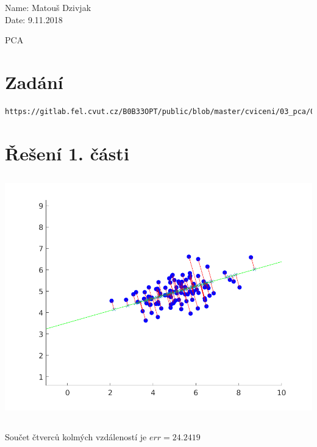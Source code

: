 \documentclass[10pt,a4paper,openright]{article}
\begin{document}
	\begin{flushleft}
		\large Name: Matouš Dzivjak\\
		\large Date: 9.11.2018\\
	\end{flushleft}
\begin{center}
	\huge PCA
\end{center}
\section{Zadání}
\begin{verbatim}
https://gitlab.fel.cvut.cz/B0B33OPT/public/blob/master/cviceni/03_pca/03_pca.pdf
\end{verbatim}


\section{Řešení 1. části}
\subsection{}
\includegraphics[scale=0.8]{line.png}

\subsection{}
\begin{center}
Součet čtverců kolmých vzdáleností je $err = 24.2419$
\end{center}
\end{document}
